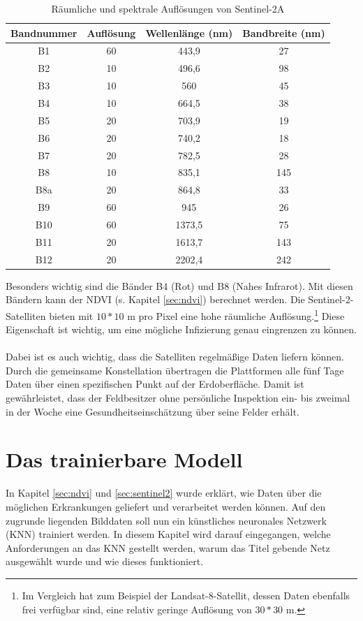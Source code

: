\begin{table}[ht]
\centering
\begin{tabular}{c|c|c|c}
Bandnummer & Auflösung & Wellenlänge (nm) & Bandbreite (nm) \\
\hline
B1 & 60 & 443,9 & 27\\
B2 & 10 & 496,6 & 98\\
B3 & 10 & 560 & 45\\
B4 & 10 & 664,5 & 38\\
B5 & 20 & 703,9 & 19\\
B6 & 20 & 740,2 & 18\\
B7 & 20 & 782,5 & 28\\
B8 & 10 & 835,1 & 145\\
B8a & 20 & 864,8 & 33\\
B9 & 60 & 945 & 26\\
B10 & 60 & 1373,5 & 75\\
B11 & 20 & 1613,7 & 143\\
B12 & 20 & 2202,4 & 242\\
\end{tabular}
\caption[Räumliche und spektrale Auflösungen von Sentinel-2A]{Räumliche und spektrale Auflösungen von Sentinel-2A\cite{ref:sentinel:radiores}}\label{tab:resolutions}
\end{table}

\noindent
Besonders wichtig sind die Bänder B4 (Rot) und B8 (Nahes Infrarot). Mit diesen Bändern kann der NDVI (s. Kapitel \ref{sec:ndvi}) berechnet werden.\cite{ref:sentinel:ndvi} Die Sentinel-2-Satelliten bieten mit $10*10$ m pro Pixel eine hohe räumliche Auflösung.\footnote{Im Vergleich hat zum Beispiel der Landsat-8-Satellit, dessen Daten ebenfalls frei verfügbar sind, eine relativ geringe Auflösung von $30*30$ m.\cite{ref:landsat}} Diese Eigenschaft ist wichtig, um eine mögliche Infizierung genau eingrenzen zu können.
\\\\
Dabei ist es auch wichtig, dass die Satelliten regelmäßige Daten liefern können. Durch die gemeinsame Konstellation übertragen die Plattformen alle fünf Tage Daten über einen spezifischen Punkt auf der Erdoberfläche.\cite{ref:sentinel:resolutions} Damit ist gewährleistet, dass der Feldbesitzer ohne persönliche Inspektion ein- bis zweimal in der Woche eine Gesundheitseinschätzung über seine Felder erhält.

\section{Das trainierbare Modell}\label{sec:maskrcnn}
In Kapitel \ref{sec:ndvi} und \ref{sec:sentinel2} wurde erklärt, wie Daten über die möglichen Erkrankungen geliefert und verarbeitet werden können. Auf den zugrunde liegenden Bilddaten soll nun ein künstliches neuronales Netzwerk (KNN) trainiert werden. In diesem Kapitel wird darauf eingegangen, welche Anforderungen an das KNN gestellt werden, warum das Titel gebende Netz ausgewählt wurde und wie dieses funktioniert.

